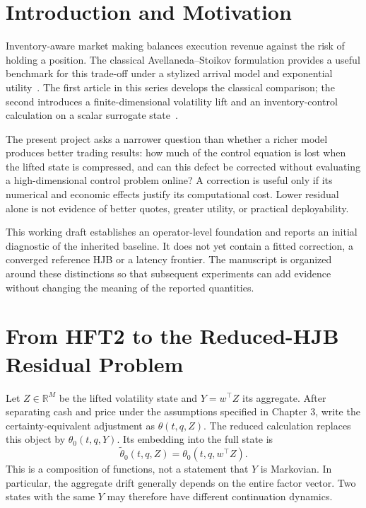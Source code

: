 ﻿\chapter*{Introduction and Motivation}
Inventory-aware market making balances execution revenue against the risk of holding a position. The classical Avellaneda--Stoikov formulation provides a useful benchmark for this trade-off under a stylized arrival model and exponential utility~\cite{as}. The first article in this series develops the classical comparison; the second introduces a finite-dimensional volatility lift and an inventory-control calculation on a scalar surrogate state~\cite{hft1,hft2}.

The present project asks a narrower question than whether a richer model produces better trading results: how much of the control equation is lost when the lifted state is compressed, and can this defect be corrected without evaluating a high-dimensional control problem online? A correction is useful only if its numerical and economic effects justify its computational cost. Lower residual alone is not evidence of better quotes, greater utility, or practical deployability.

This working draft establishes an operator-level foundation and reports an initial diagnostic of the inherited baseline. It does not yet contain a fitted correction, a converged reference HJB or a latency frontier. The manuscript is organized around these distinctions so that subsequent experiments can add evidence without changing the meaning of the reported quantities.

\chapter{From HFT2 to the Reduced-HJB Residual Problem}

Let $Z\in\mathbb R^M$ be the lifted volatility state and $Y=w^\top Z$ its aggregate. After separating cash and price under the assumptions specified in Chapter 3, write the certainty-equivalent adjustment as $\theta(t,q,Z)$. The reduced calculation replaces this object by $\theta_0(t,q,Y)$. Its embedding into the full state is
\[
 \widetilde\theta_0(t,q,Z)=\theta_0(t,q,w^\top Z).
\]
This is a composition of functions, not a statement that $Y$ is Markovian. In particular, the aggregate drift generally depends on the entire factor vector. Two states with the same $Y$ may therefore have different continuation dynamics.

